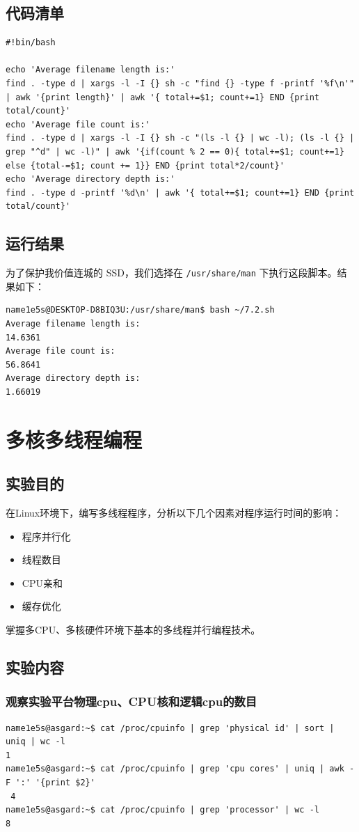 \documentclass[blue,normal,cn]{elegantnote}
\newcommand{\code}[1]{\colorbox{light-gray}{\texttt{#1}}}
\begin{document}
\subsection{代码清单}
\begin{lstlisting}
#!bin/bash

echo 'Average filename length is:'
find . -type d | xargs -l -I {} sh -c "find {} -type f -printf '%f\n'" | awk '{print length}' | awk '{ total+=$1; count+=1} END {print total/count}'
echo 'Average file count is:'
find . -type d | xargs -l -I {} sh -c "(ls -l {} | wc -l); (ls -l {} | grep "^d" | wc -l)" | awk '{if(count % 2 == 0){ total+=$1; count+=1} else {total-=$1; count += 1}} END {print total*2/count}'
echo 'Average directory depth is:'
find . -type d -printf '%d\n' | awk '{ total+=$1; count+=1} END {print total/count}'
\end{lstlisting}
\subsection{运行结果}
为了保护我价值连城的 SSD，我们选择在 \code{/usr/share/man}
下执行这段脚本。结果如下：
\begin{lstlisting}
name1e5s@DESKTOP-D8BIQ3U:/usr/share/man$ bash ~/7.2.sh
Average filename length is:
14.6361
Average file count is:
56.8641
Average directory depth is:
1.66019
\end{lstlisting}

\section{多核多线程编程}
\subsection{实验目的}
在Linux环境下，编写多线程程序，分析以下几个因素对程序运行时间的影响：
\begin{itemize}
  \item 程序并行化
  \item 线程数目
  \item CPU亲和
  \item 缓存优化
\end{itemize}
掌握多CPU、多核硬件环境下基本的多线程并行编程技术。
\subsection{实验内容}
\subsubsection{观察实验平台物理cpu、CPU核和逻辑cpu的数目}
\begin{lstlisting}
name1e5s@asgard:~$ cat /proc/cpuinfo | grep 'physical id' | sort | uniq | wc -l
1
name1e5s@asgard:~$ cat /proc/cpuinfo | grep 'cpu cores' | uniq | awk -F ':' '{print $2}'
 4
name1e5s@asgard:~$ cat /proc/cpuinfo | grep 'processor' | wc -l
8
\end{lstlisting}
\end{document}
